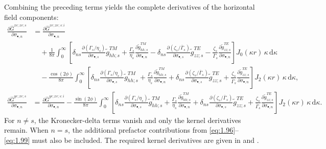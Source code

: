 \documentclass[12pt]{report}
\begin{document}
Combining the preceding terms yields the complete derivatives of the
horizontal field components:
\begin{align}
    \frac{\partial\hat{G}^{xe;xe;s}}{\partial\sigma_{\bullet,n}}
    &= \frac{\partial\hat{G}^{xe;xe;s:i}}{\partial\sigma_{\bullet,n}} \nonumber \\
    &\quad
    + \frac{1}{8\pi}\int_0^\infty\!\left[
        \delta_{ns}\frac{\partial(\Gamma_s/\eta_s)}{\partial\sigma_{\bullet,s}}
            \tilde{g}^{TM}_{hh;s}
      + \frac{\Gamma_s}{\eta_s}
            \frac{\partial\tilde{g}^{TM}_{hh;s}}{\partial\sigma_{\bullet,n}}
      - \delta_{ns}\frac{\partial(\zeta_s/\bar\Gamma_s)}{\partial\sigma_{\bullet,s}}
            \tilde{g}^{TE}_{zz;s}
      - \frac{\zeta_s}{\bar\Gamma_s}
            \frac{\partial\tilde{g}^{TE}_{zz;s}}{\partial\sigma_{\bullet,n}}
      \right]J_0(\kappa r)\,\kappa\,\mathrm{d}\kappa \nonumber \\
    &\quad
    - \frac{\cos(2\phi)}{8\pi}\int_0^\infty\!\left[
        \delta_{ns}\frac{\partial(\Gamma_s/\eta_s)}{\partial\sigma_{\bullet,s}}
            \tilde{g}^{TM}_{hh;s}
      + \frac{\Gamma_s}{\eta_s}
            \frac{\partial\tilde{g}^{TM}_{hh;s}}{\partial\sigma_{\bullet,n}}
      + \delta_{ns}\frac{\partial(\zeta_s/\bar\Gamma_s)}{\partial\sigma_{\bullet,s}}
            \tilde{g}^{TE}_{zz;s}
      + \frac{\zeta_s}{\bar\Gamma_s}
            \frac{\partial\tilde{g}^{TE}_{zz;s}}{\partial\sigma_{\bullet,n}}
      \right]J_2(\kappa r)\,\kappa\,\mathrm{d}\kappa,
    \label{eq:1.100}
\end{align}
\begin{align}
    \frac{\partial\hat{G}^{ye;xe;s}}{\partial\sigma_{\bullet,n}}
    &= \frac{\partial\hat{G}^{ye;xe;s:i}}{\partial\sigma_{\bullet,n}}
    - \frac{\sin(2\phi)}{8\pi}\int_0^\infty\!\left[
        \delta_{ns}\frac{\partial(\Gamma_s/\eta_s)}{\partial\sigma_{\bullet,s}}
            \tilde{g}^{TM}_{hh;s}
      + \frac{\Gamma_s}{\eta_s}
            \frac{\partial\tilde{g}^{TM}_{hh;s}}{\partial\sigma_{\bullet,n}}
      + \delta_{ns}\frac{\partial(\zeta_s/\bar\Gamma_s)}{\partial\sigma_{\bullet,s}}
            \tilde{g}^{TE}_{zz;s}
      + \frac{\zeta_s}{\bar\Gamma_s}
            \frac{\partial\tilde{g}^{TE}_{zz;s}}{\partial\sigma_{\bullet,n}}
      \right]J_2(\kappa r)\,\kappa\,\mathrm{d}\kappa.
    \label{eq:1.101}
\end{align}
For \(n\neq s\), the Kronecker-delta terms vanish and only the kernel
derivatives remain. When \(n=s\), the additional prefactor contributions
from \eqref{eq:1.96}--\eqref{eq:1.99} must also be included. The required
kernel derivatives are given in  and
.
\end{document}
